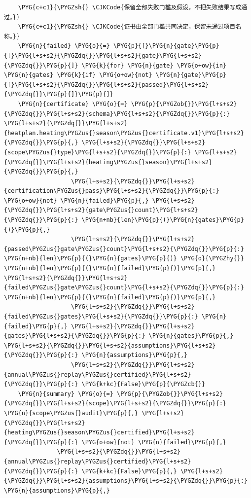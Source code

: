 \begin{Verbatim}
    \PYG{c+c1}{\PYGZsh{} \CJKCode{保留全部失败门槛及假设，不把失败结果写成通过。}}
    \PYG{c+c1}{\PYGZsh{} \CJKCode{证书由全部门槛共同决定，保留未通过项目名称。}}
    \PYG{n}{failed} \PYG{o}{=} \PYG{p}{[}\PYG{n}{gate}\PYG{p}{[}\PYG{l+s+s2}{\PYGZdq{}}\PYG{l+s+s2}{gate}\PYG{l+s+s2}{\PYGZdq{}}\PYG{p}{]} \PYG{k}{for} \PYG{n}{gate} \PYG{o+ow}{in} \PYG{n}{gates} \PYG{k}{if} \PYG{o+ow}{not} \PYG{n}{gate}\PYG{p}{[}\PYG{l+s+s2}{\PYGZdq{}}\PYG{l+s+s2}{passed}\PYG{l+s+s2}{\PYGZdq{}}\PYG{p}{]}\PYG{p}{]}
    \PYG{n}{certificate} \PYG{o}{=} \PYG{p}{\PYGZob{}}\PYG{l+s+s2}{\PYGZdq{}}\PYG{l+s+s2}{schema}\PYG{l+s+s2}{\PYGZdq{}}\PYG{p}{:} \PYG{l+s+s2}{\PYGZdq{}}\PYG{l+s+s2}{heatplan.heating\PYGZus{}season\PYGZus{}certificate.v1}\PYG{l+s+s2}{\PYGZdq{}}\PYG{p}{,} \PYG{l+s+s2}{\PYGZdq{}}\PYG{l+s+s2}{scope\PYGZus{}type}\PYG{l+s+s2}{\PYGZdq{}}\PYG{p}{:} \PYG{l+s+s2}{\PYGZdq{}}\PYG{l+s+s2}{heating\PYGZus{}season}\PYG{l+s+s2}{\PYGZdq{}}\PYG{p}{,}
                   \PYG{l+s+s2}{\PYGZdq{}}\PYG{l+s+s2}{certification\PYGZus{}pass}\PYG{l+s+s2}{\PYGZdq{}}\PYG{p}{:} \PYG{o+ow}{not} \PYG{n}{failed}\PYG{p}{,} \PYG{l+s+s2}{\PYGZdq{}}\PYG{l+s+s2}{gate\PYGZus{}count}\PYG{l+s+s2}{\PYGZdq{}}\PYG{p}{:} \PYG{n+nb}{len}\PYG{p}{(}\PYG{n}{gates}\PYG{p}{)}\PYG{p}{,}
                   \PYG{l+s+s2}{\PYGZdq{}}\PYG{l+s+s2}{passed\PYGZus{}gate\PYGZus{}count}\PYG{l+s+s2}{\PYGZdq{}}\PYG{p}{:} \PYG{n+nb}{len}\PYG{p}{(}\PYG{n}{gates}\PYG{p}{)} \PYG{o}{\PYGZhy{}} \PYG{n+nb}{len}\PYG{p}{(}\PYG{n}{failed}\PYG{p}{)}\PYG{p}{,} \PYG{l+s+s2}{\PYGZdq{}}\PYG{l+s+s2}{failed\PYGZus{}gate\PYGZus{}count}\PYG{l+s+s2}{\PYGZdq{}}\PYG{p}{:} \PYG{n+nb}{len}\PYG{p}{(}\PYG{n}{failed}\PYG{p}{)}\PYG{p}{,}
                   \PYG{l+s+s2}{\PYGZdq{}}\PYG{l+s+s2}{failed\PYGZus{}gates}\PYG{l+s+s2}{\PYGZdq{}}\PYG{p}{:} \PYG{n}{failed}\PYG{p}{,} \PYG{l+s+s2}{\PYGZdq{}}\PYG{l+s+s2}{gates}\PYG{l+s+s2}{\PYGZdq{}}\PYG{p}{:} \PYG{n}{gates}\PYG{p}{,} \PYG{l+s+s2}{\PYGZdq{}}\PYG{l+s+s2}{assumptions}\PYG{l+s+s2}{\PYGZdq{}}\PYG{p}{:} \PYG{n}{assumptions}\PYG{p}{,}
                   \PYG{l+s+s2}{\PYGZdq{}}\PYG{l+s+s2}{annual\PYGZus{}replay\PYGZus{}certified}\PYG{l+s+s2}{\PYGZdq{}}\PYG{p}{:} \PYG{k+kc}{False}\PYG{p}{\PYGZcb{}}
    \PYG{n}{summary} \PYG{o}{=} \PYG{p}{\PYGZob{}}\PYG{l+s+s2}{\PYGZdq{}}\PYG{l+s+s2}{scope}\PYG{l+s+s2}{\PYGZdq{}}\PYG{p}{:} \PYG{n}{scope\PYGZus{}audit}\PYG{p}{,} \PYG{l+s+s2}{\PYGZdq{}}\PYG{l+s+s2}{heating\PYGZus{}season\PYGZus{}certified}\PYG{l+s+s2}{\PYGZdq{}}\PYG{p}{:} \PYG{o+ow}{not} \PYG{n}{failed}\PYG{p}{,}
               \PYG{l+s+s2}{\PYGZdq{}}\PYG{l+s+s2}{annual\PYGZus{}replay\PYGZus{}certified}\PYG{l+s+s2}{\PYGZdq{}}\PYG{p}{:} \PYG{k+kc}{False}\PYG{p}{,} \PYG{l+s+s2}{\PYGZdq{}}\PYG{l+s+s2}{assumptions}\PYG{l+s+s2}{\PYGZdq{}}\PYG{p}{:} \PYG{n}{assumptions}\PYG{p}{,}

\end{Verbatim}
